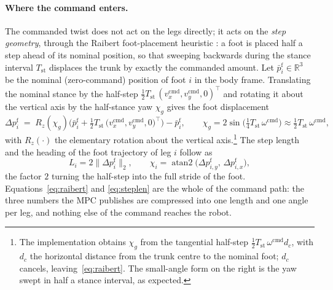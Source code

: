 \documentclass[11pt,a4paper]{article}
\newcommand{\R}{\mathbb{R}}
\newcommand{\Tst}{T_{\mathrm{st}}}
\newcommand{\pf}{p^{\mathrm{f}}}
\begin{document}
\paragraph{Where the command enters.} The commanded twist does not act on the legs directly; it acts on the
\emph{step geometry}, through the Raibert foot-placement heuristic \cite{raibert1986legged}: a foot is placed
half a step ahead of its nominal position, so that sweeping backwards during the stance interval $\Tst$
displaces the trunk by exactly the commanded amount. Let $\bar\pf_i\in\R^3$ be the nominal (zero-command)
position of foot $i$ in the body frame. Translating the nominal stance by the half-step
$\tfrac{1}{2}\Tst\,(v_x^{\mathrm{cmd}},v_y^{\mathrm{cmd}},0)^{\!\top}$ and rotating it about the vertical axis
by the half-stance yaw $\chi_g$ gives the foot displacement
\begin{equation}
  \Delta\pf_i \;=\; R_z(\chi_g)\Big(\bar\pf_i+\tfrac{1}{2}\Tst\,
                  \big(v_x^{\mathrm{cmd}},v_y^{\mathrm{cmd}},0\big)^{\!\top}\Big)-\bar\pf_i ,
  \qquad
  \chi_g = 2\sin\!\Big(\tfrac{1}{4}\Tst\,\omega^{\mathrm{cmd}}\Big)\approx\tfrac{1}{2}\Tst\,\omega^{\mathrm{cmd}} ,
  \label{eq:raibert}
\end{equation}
with $R_z(\cdot)$ the elementary rotation about the vertical axis.\footnote{The implementation obtains
$\chi_g$ from the tangential half-step $\tfrac12\Tst\,\omega^{\mathrm{cmd}}d_c$, with $d_c$ the horizontal
distance from the trunk centre to the nominal foot; $d_c$ cancels, leaving~\eqref{eq:raibert}. The small-angle
form on the right is the yaw swept in half a stance interval, as expected.} The step length and the heading of
the foot trajectory of leg $i$ follow as
\begin{equation}
  L_i = 2\big\|\Delta\pf_i\big\|_2 ,
  \qquad
  \chi_i=\operatorname{atan2}\big(\Delta\pf_{i,y},\,\Delta\pf_{i,x}\big),
  \label{eq:steplen}
\end{equation}
the factor $2$ turning the half-step into the full stride of the foot. Equations~\eqref{eq:raibert} and
\eqref{eq:steplen} are the whole of the command path: the three numbers the MPC publishes are compressed into
one length and one angle per leg, and nothing else of the command reaches the robot.
\end{document}
